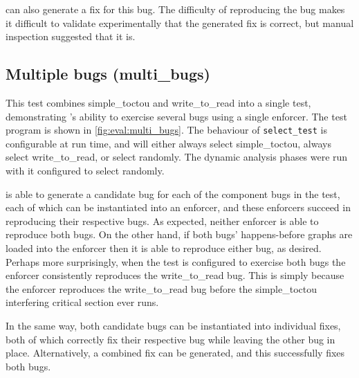 {\Technique} can also generate a fix for this bug.  The difficulty of
reproducing the bug makes it difficult to validate experimentally that
the generated fix is correct, but manual inspection suggested that it
is.

\subsection{Multiple bugs (multi\_bugs)}

This test combines simple\_toctou and write\_to\_read into a single
test, demonstrating {\technique}'s ability to exercise several bugs
using a single enforcer.  The test program is shown in
\autoref{fig:eval:multi_bugs}.  The behaviour of
\texttt{select\_test} is configurable at run time, and will either
always select simple\_toctou, always select write\_to\_read, or select
randomly.  The dynamic analysis phases were run with it configured to
select randomly.

{\Implementation} is able to generate a candidate bug for each of the
component bugs in the test, each of which can be instantiated into an
enforcer, and these enforcers succeed in reproducing their respective
bugs.  As expected, neither enforcer is able to reproduce both bugs.
On the other hand, if both bugs' happens-before graphs are loaded into
the enforcer then it is able to reproduce either bug, as desired.
Perhaps more surprisingly, when the test is configured to exercise
both bugs the enforcer consistently reproduces the write\_to\_read
bug.  This is simply because the enforcer reproduces the
write\_to\_read bug before the simple\_toctou interfering critical
section ever runs.

In the same way, both candidate bugs can be instantiated into
individual fixes, both of which correctly fix their respective bug
while leaving the other bug in place.  Alternatively, a combined fix
can be generated, and this successfully fixes both bugs.

